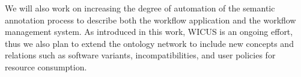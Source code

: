   We will also work on increasing  the degree of automation of the semantic annotation process to describe both the workflow application and the workflow management system. As introduced in this work, WICUS is an ongoing effort, thus we also plan to extend the ontology network to include new concepts and relations such as software variants, incompatibilities, and user policies for resource consumption.